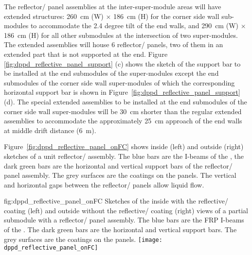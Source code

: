 The reflector/ panel assemblies at the inter-super-module areas will have extended structures: \SI{260}{\cm} (W) $\times$ \SI{186}{\cm} (H) for the corner side wall  sub-modules to accommodate the \num{2.4} degree tilt of the end walls, and \SI{290}{\cm} (W) $\times$ \SI{186}{\cm} (H) for all other  submodules at the intersection of two  super-modules. The extended assemblies will house \num{6} reflector/ panels, two of them in an extended part that is not supported at the end. Figure \ref{fig:dppd_reflective_panel_support} (c) shows the sketch of the support bar to be installed at the end submodules of the  super-modules except the end submodules of the corner  side wall super-modules of which the corresponding horizontal support bar is shown in Figure~\ref{fig:dppd_reflective_panel_support} (d). The special extended assemblies to be installed at the end submodules of the corner side wall super-modules will be \SI{30}{\cm} shorter than the regular extended assemblies to accommodate the approximately \SI{25}{\cm} approach of the end walls at middle drift distance (\SI{6}{\m}).

Figure~\ref{fig:dppd_reflective_panel_onFC} shows inside (left) and outside (right) sketches of a unit reflector/ assembly. The blue bars are the I-beams of the , the dark green bars are the horizontal and vertical support bars of the reflector/ panel assembly. The grey surfaces are the  coatings on the panels. The vertical and horizontal gaps between the reflector/ panels allow liquid flow. 

\begin{dunefigure}{fig:dppd_reflective_panel_onFC}
{Sketches of the inside with the reflective/ coating (left) and outside without the reflective/ coating (right) views of a partial  submodule with a reflector/ panel assembly. The blue bars are the FRP I-beams of the . The dark green bars are the horizontal and vertical support bars. The grey surfaces are the  coatings on the panels.}
\texttt{[image: dppd\_reflective\_panel\_onFC]}
\end{dunefigure}